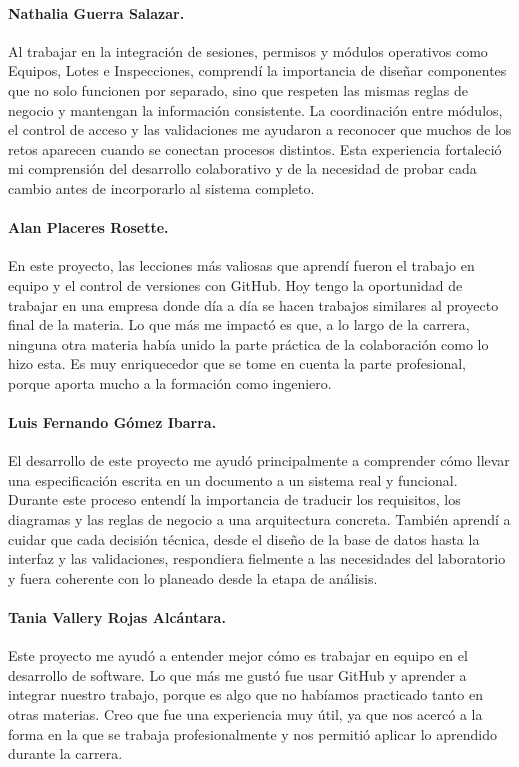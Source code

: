 \paragraph{Nathalia Guerra Salazar.} Al trabajar en la integración de sesiones, permisos y módulos operativos como Equipos, Lotes e Inspecciones, comprendí la importancia de diseñar componentes que no solo funcionen por separado, sino que respeten las mismas reglas de negocio y mantengan la información consistente. La coordinación entre módulos, el control de acceso y las validaciones me ayudaron a reconocer que muchos de los retos aparecen cuando se conectan procesos distintos. Esta experiencia fortaleció mi comprensión del desarrollo colaborativo y de la necesidad de probar cada cambio antes de incorporarlo al sistema completo.

\paragraph{Alan Placeres Rosette.} En este proyecto, las lecciones más valiosas que aprendí fueron el trabajo en equipo y el control de versiones con GitHub. Hoy tengo la oportunidad de trabajar en una empresa donde día a día se hacen trabajos similares al proyecto final de la materia. Lo que más me impactó es que, a lo largo de la carrera, ninguna otra materia había unido la parte práctica de la colaboración como lo hizo esta. Es muy enriquecedor que se tome en cuenta la parte profesional, porque aporta mucho a la formación como ingeniero.

\paragraph{Luis Fernando Gómez Ibarra.} El desarrollo de este proyecto me ayudó principalmente a comprender cómo llevar una especificación escrita en un documento a un sistema real y funcional. Durante este proceso entendí la importancia de traducir los requisitos, los diagramas y las reglas de negocio a una arquitectura concreta. También aprendí a cuidar que cada decisión técnica, desde el diseño de la base de datos hasta la interfaz y las validaciones, respondiera fielmente a las necesidades del laboratorio y fuera coherente con lo planeado desde la etapa de análisis.

\paragraph{Tania Vallery Rojas Alcántara.} Este proyecto me ayudó a entender mejor cómo es trabajar en equipo en el desarrollo de software. Lo que más me gustó fue usar GitHub y aprender a integrar nuestro trabajo, porque es algo que no habíamos practicado tanto en otras materias. Creo que fue una experiencia muy útil, ya que nos acercó a la forma en la que se trabaja profesionalmente y nos permitió aplicar lo aprendido durante la carrera.
